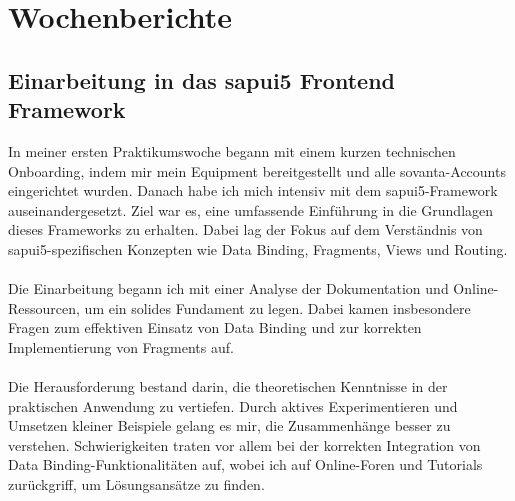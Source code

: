 \chapter{Wochenberichte}
\label{ch:wochenberichte}

\section{Einarbeitung in das \gls{sapui5} Frontend Framework}
In meiner ersten Praktikumswoche begann mit einem kurzen technischen Onboarding, indem mir mein Equipment bereitgestellt und alle sovanta-Accounts eingerichtet wurden. Danach habe ich mich intensiv mit dem \gls{sapui5}-Framework auseinandergesetzt. Ziel war es, eine umfassende Einführung in die Grundlagen dieses Frameworks zu erhalten. Dabei lag der Fokus auf dem Verständnis von \gls{sapui5}-spezifischen Konzepten wie Data Binding, Fragments, Views und Routing. \\\\
Die Einarbeitung begann ich mit einer Analyse der Dokumentation und Online-Ressourcen, um ein solides Fundament zu legen. Dabei kamen insbesondere Fragen zum effektiven Einsatz von Data Binding und zur korrekten Implementierung von Fragments auf. \\\\
Die Herausforderung bestand darin, die theoretischen Kenntnisse in der praktischen Anwendung zu vertiefen. Durch aktives Experimentieren und Umsetzen kleiner Beispiele gelang es mir, die Zusammenhänge besser zu verstehen. Schwierigkeiten traten vor allem bei der korrekten Integration von Data Binding-Funktionalitäten auf, wobei ich auf Online-Foren und Tutorials zurückgriff, um Lösungsansätze zu finden. \\\\

